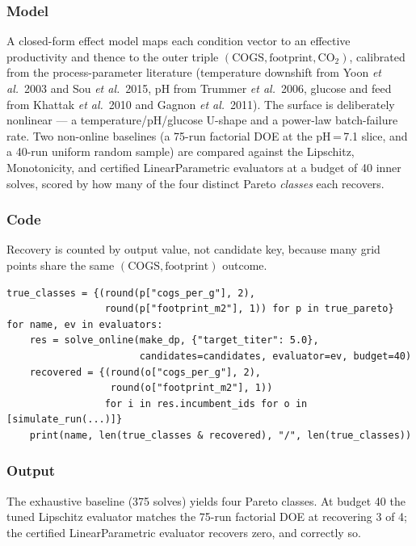 \documentclass[11pt,a4paper]{article}
\newcommand{\etal}{\textit{et al.}}
\begin{document}
\subsubsection*{Model}

A closed-form effect model maps each condition vector to an effective
productivity and thence to the outer triple
$(\text{COGS}, \text{footprint}, \text{CO}_2)$, calibrated from the
process-parameter literature (temperature downshift from Yoon \etal\
2003 and Sou \etal\ 2015, pH from Trummer \etal\ 2006, glucose and feed
from Khattak \etal\ 2010 and Gagnon \etal\ 2011). The surface is
deliberately nonlinear --- a temperature/pH/glucose U-shape and a
power-law batch-failure rate. Two non-online baselines (a 75-run
factorial DOE at the pH\,=\,7.1 slice, and a 40-run uniform random
sample) are compared against the Lipschitz, Monotonicity, and certified
LinearParametric evaluators at a budget of 40 inner solves, scored by
how many of the four distinct Pareto \emph{classes} each recovers.

\subsubsection*{Code}

Recovery is counted by output value, not candidate key, because many
grid points share the same $(\text{COGS}, \text{footprint})$ outcome.

\begin{lstlisting}
true_classes = {(round(p["cogs_per_g"], 2),
                 round(p["footprint_m2"], 1)) for p in true_pareto}
for name, ev in evaluators:
    res = solve_online(make_dp, {"target_titer": 5.0},
                       candidates=candidates, evaluator=ev, budget=40)
    recovered = {(round(o["cogs_per_g"], 2),
                  round(o["footprint_m2"], 1))
                 for i in res.incumbent_ids for o in [simulate_run(...)]}
    print(name, len(true_classes & recovered), "/", len(true_classes))
\end{lstlisting}

\subsubsection*{Output}

The exhaustive baseline (375 solves) yields four Pareto classes. At
budget 40 the tuned Lipschitz evaluator matches the 75-run factorial
DOE at recovering 3 of 4; the certified LinearParametric evaluator
recovers zero, and correctly so.
\end{document}
